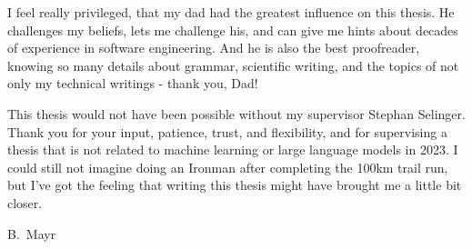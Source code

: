 I feel really privileged, that my dad had the greatest influence on this thesis.
He challenges my beliefs, lets me challenge his, and can give me hints about decades of experience in software engineering.
And he is also the best proofreader, knowing so many details about grammar, scientific writing, and the topics of not only my technical writings - thank you, Dad!

This thesis would not have been possible without my supervisor Stephan Selinger.
Thank you for your input, patience, trust, and flexibility, and for supervising a thesis that is not related to machine learning or large language models in 2023.
I could still not imagine doing an Ironman after completing the 100km trail run, but I've got the feeling that writing this thesis might have brought me a little bit closer.

\vspace{6ex}
\noindent
B.\ Mayr